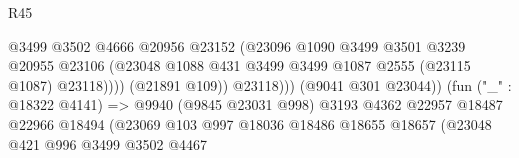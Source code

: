 \begin{lexlean}{R45}
\begin{coremodule}
                                                      @3499
                                                      @3502
                                                      @4666
                                                      @20956
                                                      @23152
                                                      (@23096
                                                        @1090
                                                        @3499
                                                        @3501
                                                        @3239
                                                        @20955
                                                        @23106
                                                        (@23048
                                                          @1088
                                                          @431
                                                          @3499
                                                          @3499
                                                          @1087
                                                          @2555
                                                          (@23115 @1087)
                                                          @23118))))
                                                  (@21891 @109))
                                                @23118)))
                                          (@9041 @301 @23044))
                                        (fun ("_" : @18322 @4141) =>
                                        @9940
                                          (@9845 @23031 @998)
                                          @3193
                                          @4362
                                          @22957
                                          @18487
                                          @22966
                                          @18494
                                          (@23069
                                            @103
                                            @997
                                            @18036
                                            @18486
                                            @18655
                                            @18657
                                            (@23048
                                              @421
                                              @996
                                              @3499
                                              @3502
                                              @4467

\end{coremodule}
\end{lexlean}

